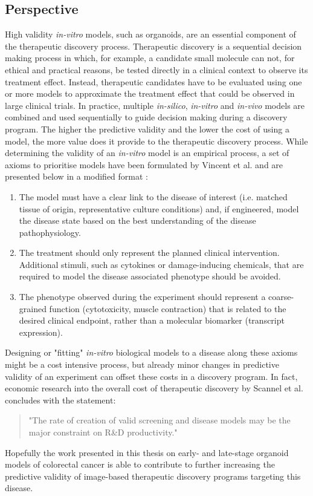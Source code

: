 \begin{flushleft}
\section{Perspective}

High validity \textit{in-vitro} models, such as organoids, are an essential component of the therapeutic discovery process. Therapeutic discovery is a sequential decision making process in which, for example, a candidate small molecule can not, for ethical and practical reasons, be tested directly in a clinical context to observe its treatment effect. Instead, therapeutic candidates have to be evaluated using one or more models to approximate the treatment effect that could be observed in large clinical trials. In practice, multiple \textit{in-silico}, \textit{in-vitro} and \textit{in-vivo} models are combined and used sequentially to guide decision making during a discovery program. The higher the predictive validity and the lower the cost of using a model, the more value does it provide to the therapeutic discovery process. While determining the validity of an \textit{in-vitro} model is an empirical process, a set of axioms to prioritise models have been formulated by Vincent et al. and are presented below in a modified format \parencite{vincentDevelopingPredictiveAssays2015}: 

\begin{enumerate}
    \item The model must have a clear link to the disease of interest (i.e. matched tissue of origin, representative culture conditions) and, if engineered, model the disease state based on the best understanding of the disease pathophysiology.
    \item The treatment should only represent the planned clinical intervention. Additional stimuli, such as cytokines or damage-inducing chemicals, that are required to model the disease associated phenotype should be avoided.
    \item The phenotype observed during the experiment should represent a coarse-grained function (cytotoxicity, muscle contraction) that is related to the desired clinical endpoint, rather than a molecular biomarker (transcript expression).
\end{enumerate}

Designing or "fitting" \textit{in-vitro} biological models to a disease along these axioms might be a cost intensive process, but already minor changes in predictive validity of an experiment can offset these costs in a discovery program. In fact, economic research into the overall cost of therapeutic discovery by Scannel et al. \parencite{scannellWhenQualityBeats2016} concludes with the statement:

\begin{quote}
"The rate of creation of valid screening and disease models may be the major constraint on R\&D productivity."
\end{quote}

Hopefully the work presented in this thesis on early- and late-stage organoid models of colorectal cancer is able to contribute to further increasing the predictive validity of image-based therapeutic discovery programs targeting this disease. 
\end{flushleft}
